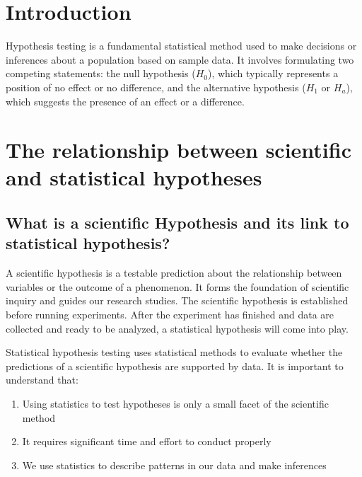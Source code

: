 \documentclass[
]{book}
\providecommand{\tightlist}{%
  \setlength{\itemsep}{0pt}\setlength{\parskip}{0pt}}
\begin{document}
\section{Introduction}\label{introduction-7}

Hypothesis testing is a fundamental statistical method used to make decisions or inferences about a population based on sample data. It involves formulating two competing statements: the null hypothesis (\(H_0\)), which typically represents a position of no effect or no difference, and the alternative hypothesis (\(H_1\) or \(H_a\)), which suggests the presence of an effect or a difference.

\section{The relationship between scientific and statistical hypotheses}\label{the-relationship-between-scientific-and-statistical-hypotheses}

\subsection{What is a scientific Hypothesis and its link to statistical hypothesis?}\label{what-is-a-scientific-hypothesis-and-its-link-to-statistical-hypothesis}

A scientific hypothesis is a testable prediction about the relationship between variables or the outcome of a phenomenon. It forms the foundation of scientific inquiry and guides our research studies. The scientific hypothesis is established before running experiments. After the experiment has finished and data are collected and ready to be analyzed, a statistical hypothesis will come into play.

Statistical hypothesis testing uses statistical methods to evaluate whether the predictions of a scientific hypothesis are supported by data. It is important to understand that:

\begin{enumerate}
\def\labelenumi{\arabic{enumi}.}
\tightlist
\item
  Using statistics to test hypotheses is only a small facet of the scientific method
\item
  It requires significant time and effort to conduct properly
\item
  We use statistics to describe patterns in our data and make inferences
\end{enumerate}
\end{document}
